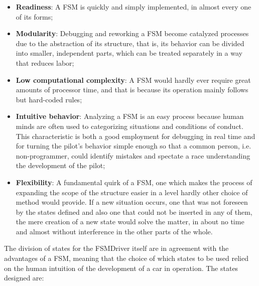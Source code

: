 \begin{itemize}
	\item \textbf{Readiness}: A FSM is quickly and simply implemented, in almost every one of its forms;
	
	\item \textbf{Modularity}: Debugging and reworking a FSM become catalyzed processes due to the abstraction of its structure, that is, its behavior can be divided into smaller, independent parts, which can be treated separately in a way that reduces labor;
	
	\item \textbf{Low computational complexity}: A FSM would hardly ever require great amounts of processor time, and that is because its operation mainly follows but hard-coded rules;
	
	\item \textbf{Intuitive behavior}: Analyzing a FSM is an easy process because human minds are often used to categorizing situations and conditions of conduct. This characteristic is both a good employment for debugging in real time and for turning the pilot's behavior simple enough so that a common person, i.e. non-programmer, could identify mistakes and spectate a race understanding the development of the pilot;
	
	\item \textbf{Flexibility}: A fundamental quirk of a FSM, one which makes the process of expanding the scope of the structure easier in a level hardly other choice of method would provide. If a new situation occurs, one that was not foreseen by the states defined and also one that could not be inserted in any of them, the mere creation of a new state would solve the matter, in about no time and almost without interference in the other parts of the whole.
\end{itemize}

The division of states for the FSMDriver itself are in agreement with the advantages of a FSM, meaning that the choice of which states to be used relied on the human intuition of the development of a car in operation. The states designed are:

